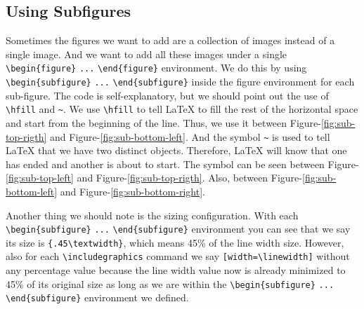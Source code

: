 \subsection{Using Subfigures}

Sometimes the figures we want to add are a collection of images instead of a single image. And we want to add all these images under a single \verb|\begin{figure}| \verb|...| \verb|\end{figure}| environment. We do this by using \verb|\begin{subfigure}| \verb|...| \verb|\end{subfigure}| inside the figure environment for each sub-figure. The code is self-explanatory, but we should point out the use of \verb|\hfill| and \verb|~|. We use \verb|\hfill| to tell {\LaTeX} to fill the rest of the horizontal space and start from the beginning of the line. Thus, we use it between Figure-\ref{fig:sub-top-rigth} and Figure-\ref{fig:sub-bottom-left}. And the symbol \verb|~| is used to tell {\LaTeX} that we have two distinct objects. Therefore, {\LaTeX} will know that one has ended and another is about to start. The symbol can be seen between Figure-\ref{fig:sub-top-left} and Figure-\ref{fig:sub-top-rigth}. Also, between Figure-\ref{fig:sub-bottom-left} and Figure-\ref{fig:sub-bottom-right}.

Another thing we should note is the sizing configuration. With each \verb|\begin{subfigure}| \verb|...| \verb|\end{subfigure}| environment you can see that we say its size is \verb|{.45\textwidth}|, which means 45\% of the line width size. However, also for each \verb|\includegraphics| command we say \verb|[width=\linewidth]| without any percentage value because the line width value now is already minimized to 45\% of its original size as long as we are within the \verb|\begin{subfigure}| \verb|...| \verb|\end{subfigure}| environment we defined.

